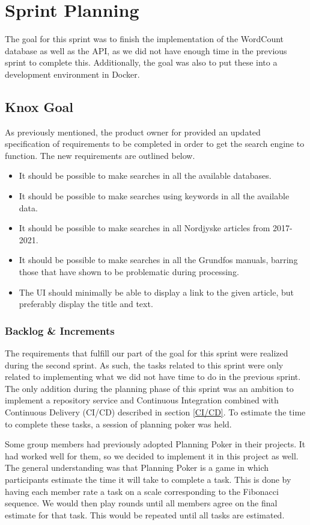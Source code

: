 \section{Sprint Planning}\label{sec:sprintPlanningSprint3}
The goal for this sprint was to finish the implementation of the WordCount database as well as the API, as we did not have enough time in the previous sprint to complete this. Additionally, the goal was also to put these into a development environment in Docker.

\subsection{Knox Goal}\label{ssec:sprint3Goal}
As previously mentioned, the product owner for \knox{} provided an updated specification of requirements to be completed in order to get the search engine to function. The new requirements are outlined below. 
\begin{itemize}
	\item It should be possible to make searches in all the available databases.
	\item It should be possible to make searches using keywords in all the available data.
	\item It should be possible to make searches in all Nordjyske articles from 2017-2021.
	\item It should be possible to make searches in all the Grundfos manuals, barring those that have shown to be problematic during processing.
	\item The UI should minimally be able to display a link to the given article, but preferably display the title and text.
\end{itemize}


\subsubsection{Backlog \& Increments}
The requirements that fulfill our part of the \knox{} goal for this sprint were realized during the second sprint. As such, the tasks related to this sprint were only related to implementing what we did not have time to do in the previous sprint. 
The only addition during the planning phase of this sprint was an ambition to implement a repository service and Continuous Integration combined with Continuous Delivery (CI/CD) described in section \ref{CI/CD}.
To estimate the time to complete these tasks, a session of planning poker was held. 

Some group members had previously adopted Planning Poker in their projects. It had worked well for them, so we decided to implement it in this project as well. The general understanding was that Planning Poker is a game in which participants estimate the time it will take to complete a task. This is done by having each member rate a task on a scale corresponding to the Fibonacci sequence. We would then play rounds until all members agree on the final estimate for that task. This would be repeated until all tasks are estimated.

